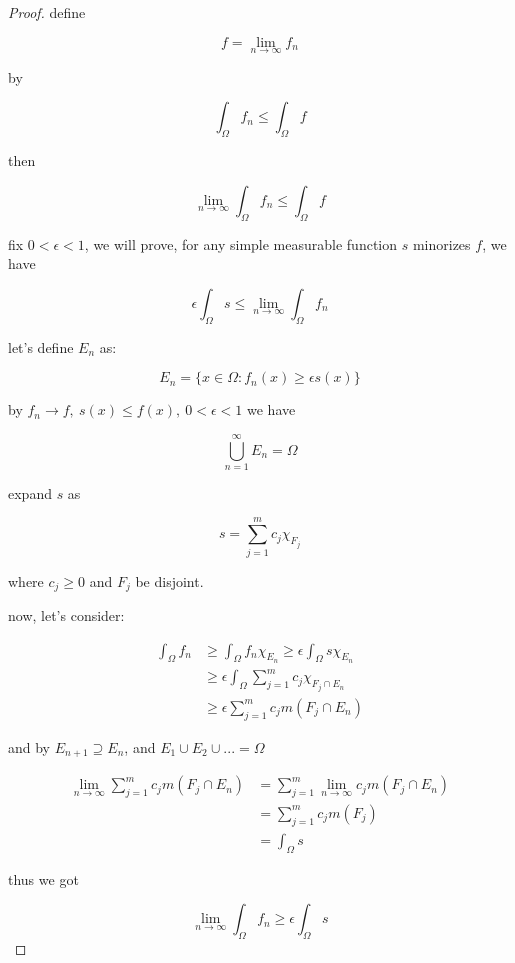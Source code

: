 \begin{proof}
    define 

    \[
        f = \lim_{n \to \infty}f_n
    \]

    by 

    \[
        \int_{\Omega} f_n \le \int_{\Omega} f
    \]

    then

    \[
        \lim_{n \to \infty}\int_{\Omega} f_n \le \int_{\Omega} f
    \]

    fix $0 < \epsilon < 1$, we will prove, for any simple measurable function $s$ minorizes $f$, we have

    \[
        \epsilon\int_{\Omega} s \le \lim_{n \to \infty}\int_{\Omega} f_n
    \]

    let's define $E_n$ as:

    \[
        E_n = \{ x \in \Omega: f_n(x) \ge \epsilon s(x) \}
    \]

    by $f_n \to f,\: s(x) \le f(x), \: 0 < \epsilon < 1$  we have

    \[
        \bigcup_{n=1}^{\infty}E_n = \Omega
    \]

    expand $s$ as 

    \[
        s = \sum_{j=1}^{m}c_j \chi_{F_j}
    \]

    where $c_j \ge 0$ and $F_j$ be disjoint.

    now, let's consider:

    \begin{align*}
        \int_{\Omega} f_n  &\ge \int_{\Omega} f_n \chi_{E_n} \ge \epsilon \int_{\Omega} s \chi_{E_n} \\
        & \ge \epsilon \int_{\Omega}\sum_{j=1}^{m}c_j \chi_{F_j \cap E_n} \\
        & \ge \epsilon \sum_{j=1}^{m}c_j m(F_j \cap E_n)
    \end{align*}

    and by $E_{n+1} \supseteq E_n$, and $E_1 \cup E_2 \cup ... = \Omega$

    \begin{align*}
        \lim_{n \to \infty}  \sum_{j=1}^{m}c_j m(F_j \cap E_n) &= \sum_{j=1}^{m} \lim_{n \to \infty} c_j m(F_j \cap E_n) \\
        & = \sum_{j=1}^{m} c_j m(F_j) \\
        &= \int_{\Omega} s
    \end{align*}

    thus we got

    \[
        \lim_{n \to \infty}\int_{\Omega} f_n  \ge \epsilon \int_{\Omega} s
    \]


\end{proof}
